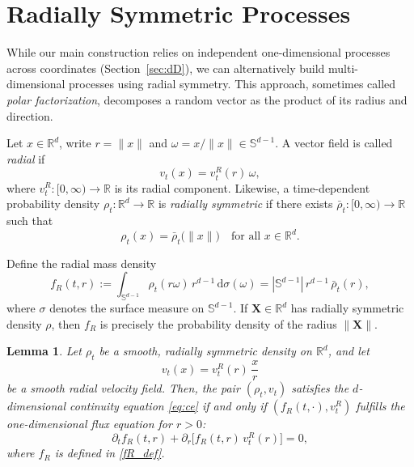 \documentclass{article}
\theoremstyle{plain}
\newtheorem{lemma}[theorem]{Lemma}
\theoremstyle{definition}
\theoremstyle{remark}
\begin{document}

\section{Radially Symmetric Processes}\label{sec:radial}

While our main construction relies on independent one-dimensional processes across coordinates (Section~\ref{sec:dD}), we can alternatively build multi-dimensional processes using radial symmetry. This approach, sometimes called \emph{polar factorization}, decomposes a random vector as the product of its radius and direction.

Let $x \in \mathbb{R}^d$, write $r = \|x\|$ and $\omega = x/\|x\| \in \mathbb{S}^{d-1}$. A vector field is called \emph{radial} if
\begin{equation}
v_t(x) = v_t^R(r)\,\omega,
\end{equation}
where $v_t^R : [0,\infty) \to \mathbb{R}$ is its radial component. Likewise, a time-dependent probability density $\rho_t\colon\mathbb{R}^d\to\mathbb{R}$ is \emph{radially symmetric} if there exists $\bar\rho_t\colon[0,\infty)\to\mathbb{R}$ such that
\begin{equation}
\rho_t(x) = \bar\rho_t\bigl(\|x\|\bigr)
\quad\text{for all }x\in\mathbb{R}^d.
\end{equation}

Define the radial mass density
\begin{equation}\label{fR_def}
f_R(t,r)
:= 
\int_{\mathbb{S}^{d-1}} \rho_t(r \omega)\, r^{d-1}\, \mathrm{d}\sigma(\omega)
= 
|\mathbb{S}^{d-1}|\, r^{d-1}\, \bar\rho_t(r),
\end{equation}
where $\sigma$ denotes the surface measure on $\mathbb{S}^{d-1}$. If $\mathbf{X} \in \mathbb{R}^d$ has radially symmetric density $\rho$, then $f_R$ is precisely the probability density of the radius $\|\mathbf{X}\|$.

\begin{lemma}\label{lem:radial_continuity}
Let $\rho_t$ be a smooth, radially symmetric density on $\mathbb{R}^d$, and let
\begin{equation}
v_t(x) = v_t^R(r)\, \frac{x}{r}
\end{equation}
be a smooth radial velocity field. Then, the pair $(\rho_t, v_t)$ satisfies the $d$-dimensional continuity equation \eqref{eq:ce}
if and only if $(f_R(t,\cdot), v_t^R)$ fulfills the one-dimensional flux equation for $r > 0$:
\begin{equation}\label{1d_flux}
\partial_t f_R(t,r) + \partial_r\bigl[f_R(t,r)\, v_t^R(r)\bigr] = 0,
\end{equation}
where $f_R$ is defined in \eqref{fR_def}.
\end{lemma}
\end{document}
